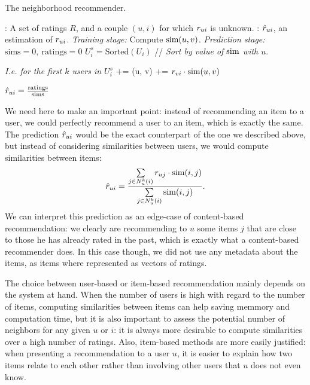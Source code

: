 \begin{algorithm}[!ht]
 \caption{The neighborhood recommender.}
       \label{ALGO:neighborhood_prediction}
       \begin{algorithmic}

         : A set of ratings $R$, and a couple $(u, i)$ for
         which $r_{ui}$ is  unknown.
         : $\hat{r}_{ui}$, an estimation of $r_{ui}$.
         \STATE \textit{Training stage:}
         \STATE Compute $\text{sim}(u, v)$.
	    \ENDFOR
       \STATE \textit{Prediction stage:}
         \STATE $\text{sims} = 0, ~ \text{ratings} = 0$
         \STATE $U_i^s = \text{Sorted}(U_i)$  // \textit{Sort by value of
         $\text{sim}$ with $u$}.

         \STATE \textit{I.e. for the first $k$ users in $U_i^s$}
         \STATE {} += \ssim(u, v)
         \STATE {} += $r_{vi} \cdot \text{sim}(u, v)$
         \ENDFOR

         \STATE $\hat{r}_{ui} = \frac{\text{ratings}}{\text{sims}}$
\end{algorithmic}
\end{algorithm}

We need here to make an important point: instead of recommending an item to a
user, we could perfectly recommend a user to an item, which is exactly the
same. The prediction $\hat{r}_{ui}$ would be the exact counterpart of the one we
described above, but instead of considering similarities between users, we
would compute similarities between items:
$$\hat{r}_{ui} = \frac{\sum\limits_{j \in N_u^k(i)} r_{uj} \cdot \text{sim}(i, j)}
{\sum\limits_{j \in N_u^k(i)}\text{sim}(i, j)}.$$
We can interpret this prediction as an edge-case of content-based
recommendation: we clearly are recommending to $u$ some items $j$ that are
close to those he has already rated in the past, which is exactly what a
content-based recommender does. In this case though, we did not use any
metadata about the items, as items where represented as vectors of ratings.

The choice between user-based or item-based recommendation mainly depends on
the system at hand. When the number of users is high with regard to the number
of items, computing similarities between items can help saving memmory and
computation time, but it is also important to assess the potential number of
neighbors for any given $u$ or $i$: it is always more desirable to compute
similarities over a high number of ratings. Also, item-based methods are
more easily justified: when presenting a recommendation to a user $u$, it is
easier to explain how two items relate to each other rather than involving
other users that $u$ does not even know.

